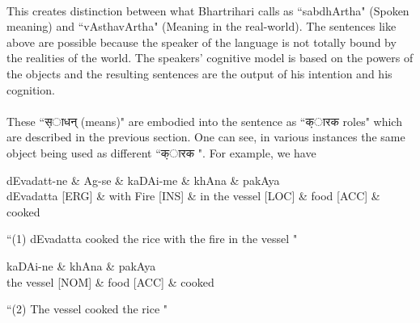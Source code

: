\documentclass[a4paper,10pt]{article}
\begin{document}
\paragraph{} This creates distinction between what Bhartrihari calls as ``sabdhArtha" (Spoken meaning) and ``vAsthavArtha" (Meaning in the real-world). 
The sentences like above are possible because the speaker of the language is not totally bound by the realities of the world. 
The speakers' cognitive model is based on the powers of the objects and the resulting sentences are the output of his intention and his cognition.

\paragraph{} These ``{\d साधन्} (means)" are embodied into the sentence as ``{\d कारक } roles" which are described in the previous section. 
One can see, in various instances the same object being used as different ``{\d कारक }". For example, we have 
\hypertarget{fig1}{}

\begin{center}
\begin{dependency}[arc edge, arc angle=80, text only label, label style={above}]
   \begin{deptext}[column sep=1em]
      dEvadatt-ne \& Ag-se \& kaDAi-me \& khAna \& pakAya \\
      dEvadatta [ERG] \& with Fire [INS] \& in the vessel [LOC] \& food [ACC]  \& cooked \\
   \end{deptext}
\end{dependency} 

 ``(1) dEvadatta cooked the rice with the fire in the vessel " 
 

\end{center}

\hypertarget{fig2}{}

\begin{center}
\begin{dependency}[arc edge, arc angle=80, text only label, label style={above}]
   \begin{deptext}[column sep=1em]
      kaDAi-ne \& khAna \& pakAya \\
      the vessel [NOM] \& food [ACC]  \& cooked \\
   \end{deptext}
\end{dependency} 

 ``(2) The vessel cooked the rice " 
 

\end{center}
\end{document}

